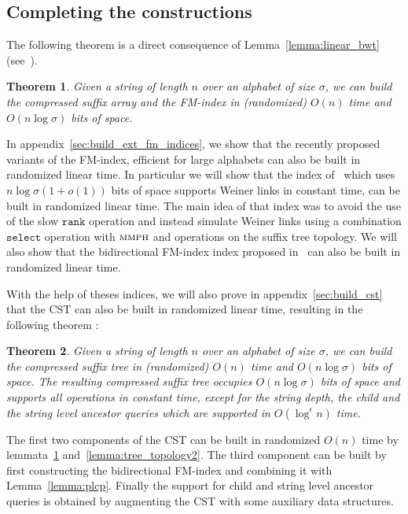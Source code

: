 \documentclass[a4paper]{article}
\newtheorem{theorem}{Theorem}
\begin{document}
\subsection{Completing the constructions}
The following theorem is a direct consequence of Lemma~\ref{lemma:linear_bwt} (see~\cite{HSS09}).
\begin{theorem}
\label{theo:build_bwt}
Given a string of length $n$ over an alphabet of size $\sigma$, we can build the compressed suffix array and the FM-index in (randomized) $O(n)$ time and $O(n\log\sigma)$ bits of space. 
\end{theorem}
In appendix~\ref{sec:build_ext_fm_indices}, 
we show that the recently proposed variants of the FM-index, efficient for large alphabets can also be built in randomized linear time. In particular we will show that the index of~\cite{BNtalg14} which uses $n\log\sigma(1+o(1))$ bits of space supports Weiner links in constant time, can be built in randomized linear time. The main idea of that index was to avoid the use
of the slow $\mathtt{rank}$ operation and instead simulate Weiner links using a combination $\mathtt{select}$ operation with $\textsc{mmph}$ and operations on the suffix tree topology. 
We will also show that the bidirectional FM-index index proposed in~\cite{BCKM13} can also be built in randomized linear time. 

With the help of theses indices, we will also prove in appendix~\ref{sec:build_cst} 
that the \textsc{CST} can also be built in randomized linear time, resulting in the following theorem :

\begin{theorem}
\label{theo:cst_large_alphabet}
Given a string of length $n$ over an alphabet of size $\sigma$, we can build the compressed suffix tree in (randomized) $O(n)$ time and $O(n\log\sigma)$ bits of space. The resulting compressed suffix tree occupies $O(n\log\sigma)$ bits of 
space and supports all operations in constant time, except for the string depth, the child and the string level ancestor queries which are supported in $O(\log^\epsilon n)$ time. 
\end{theorem}
The first two components of the \textsc{CST} can be built in randomized $O(n)$ time by lemmata~\ref{theo:build_bwt} and~\ref{lemma:tree_topology2}. 
The third component can be built by first constructing the bidirectional FM-index and combining it with Lemma~\ref{lemma:plcp}. 
Finally the support for child and string level ancestor queries is obtained by augmenting the \textsc{CST} with some auxiliary data structures. 
\end{document}
